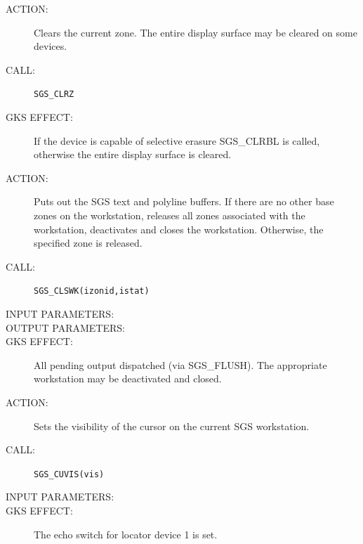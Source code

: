 \documentclass[11pt]{article}
\newcommand{\htmlref}[2]{#1}
\begin{document}
\begin{description}
\item [ACTION:]
Clears the current zone.
The entire display surface may be cleared on some devices.
\item [CALL:]
{\tt SGS\_CLRZ}
\item [GKS EFFECT:]
If the device is capable of selective erasure 
\htmlref{SGS\_CLRBL}{SGS_CLRBL} is called, otherwise
the entire display surface is cleared.
\end{description}
\goodbreak

\begin{description}
\item [ACTION:]
Puts out the SGS text and polyline buffers.
If there are no other base zones on the workstation, releases all zones
associated with the workstation, deactivates and closes the workstation.
Otherwise, the specified zone is released.
\item [CALL:]
{\tt SGS\_CLSWK(izonid,istat)}
\item [INPUT PARAMETERS:]
\begin{params}
\end{params}
\item [OUTPUT PARAMETERS:]
\begin{params}
\end{params}
\item [GKS EFFECT:]
All pending output dispatched (via \htmlref{SGS\_FLUSH}{SGS_FLUSH}).
The appropriate workstation may be deactivated and closed.
\end{description}
\goodbreak

\begin{description}
\item [ACTION:]
Sets the visibility of the cursor on the current SGS workstation.
\item [CALL:]
{\tt SGS\_CUVIS(vis)}
\item [INPUT PARAMETERS:]
\begin{params}
\end{params}
\item [GKS EFFECT:]
The echo switch for locator device 1 is set.
\end{description}
\goodbreak
\end{document}
